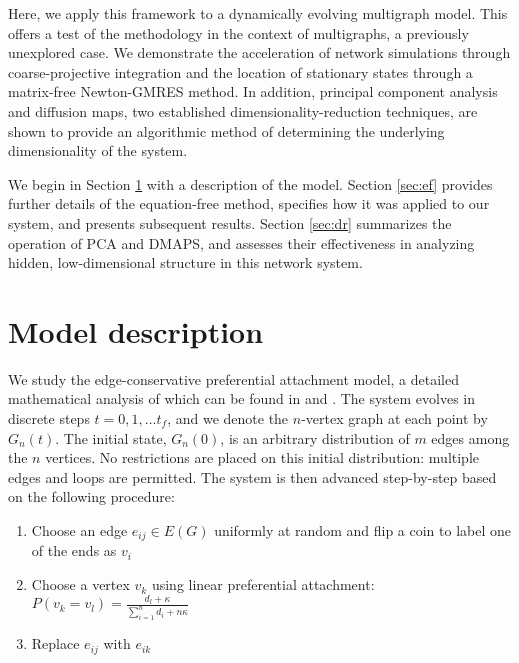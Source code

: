 \documentclass[epjST, final]{svjour}
\newcommand\ignore[1]{}
\begin{document}
\begin{onehalfspace}
Here, we apply this framework to a dynamically evolving multigraph model. This offers a test of the methodology in the context of multigraphs, a previously unexplored case. We demonstrate the acceleration of network simulations through coarse-projective integration and the location of stationary states through a matrix-free Newton-GMRES method. In addition, principal component analysis and diffusion maps, two established dimensionality-reduction techniques, are shown to provide an algorithmic method of determining the underlying dimensionality of the system. \par

We begin in Section \ref{sec:m} with a description of the
model. Section \ref{sec:ef} provides further details of the
equation-free method, specifies how it was applied to our system, and
presents subsequent results. Section \ref{sec:dr} summarizes the
operation of PCA and DMAPS, and assesses their effectiveness in
analyzing hidden, low-dimensional structure in this network system.

\section{Model description}
\label{sec:m}

We study the edge-conservative preferential attachment model, a
detailed mathematical analysis of which can be found in
\cite{rath_time_2012} and \cite{rath_multigraph_2012}. The system
evolves in discrete steps $t = 0,1,\ldots t_f$, and we denote the
$n$-vertex graph at each point by $G_n(t)$. The initial state,
$G_n(0)$, is an arbitrary distribution of $m$ edges among the $n$
vertices. No restrictions are placed on this initial distribution:
multiple edges and loops are permitted.\ignore{an Erd\H{o}s-R\'{e}nyi
  random graph on $n$ vertices and $m$ edges. Here, however, $m$ may
  be larger than the total number of edges in a completely-connected
  $n$-vertex graph so we cannot assign a probability to each edges
  existence, instead placing $m$ edges at random in the graph.} The
system is then advanced step-by-step based on the following procedure:

\begin{enumerate}
\item Choose an edge $e_{ij} \in E(G)$ uniformly at random and flip a coin to label one of the ends as $v_{i}$
\item Choose a vertex $v_{k}$ using linear preferential attachment: $P(v_{k} = v_{l}) = \frac{d_{l} + \kappa}{\sum\limits_{i=1}^{n} d_{i} + n \kappa}$
\item Replace $e_{ij}$ with $e_{ik}$
\end{enumerate}


\end{onehalfspace}
\end{document}
